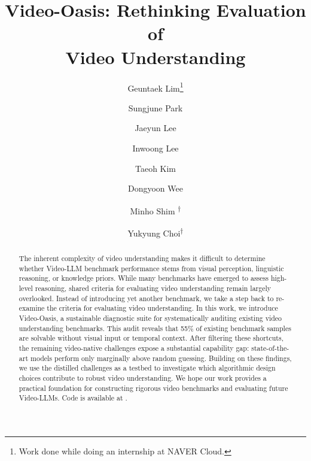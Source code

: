 \documentclass[runningheads]{llncs}
\begin{document}
\title{Video-Oasis: Rethinking Evaluation of\\ Video Understanding} 
\author{Geuntaek Lim\thanks{Work done while doing an internship at NAVER Cloud.} \and 
Sungjune Park \and 
Jaeyun Lee \and 
Inwoong Lee \and 
Taeoh Kim \and 
Dongyoon Wee \and 
Minho Shim \textsuperscript{$\dagger$} \and 
Yukyung Choi\textsuperscript{$\dagger$}}
\maketitle
\begingroup
\renewcommand\thefootnote{$\dagger$}
\endgroup

\begin{abstract}
    The inherent complexity of video understanding makes it difficult to determine whether Video-LLM benchmark performance stems from visual perception, linguistic reasoning, or knowledge priors.
    While many benchmarks have emerged to assess high-level reasoning, shared criteria for evaluating video understanding remain largely overlooked.
    Instead of introducing yet another benchmark, we take a step back to re-examine the criteria for evaluating video understanding.
    In this work, we introduce Video-Oasis, a sustainable diagnostic suite for systematically auditing existing video understanding benchmarks.
    This audit reveals that 55\% of existing benchmark samples are solvable without visual input or temporal context.
    After filtering these shortcuts, the remaining video-native challenges expose a substantial capability gap: state-of-the-art models perform only marginally above random guessing.
    Building on these findings, we use the distilled challenges as a testbed to investigate which algorithmic design choices contribute to robust video understanding.
    We hope our work provides a practical foundation for constructing rigorous video benchmarks and evaluating future Video-LLMs.
    Code is available at \href{https://github.com/sejong-rcv/Video-Oasis} {\color{magenta}{https://github.com/sejong-rcv/Video-Oasis}}.

   \vspace{-3mm}

\end{abstract}
\end{document}
